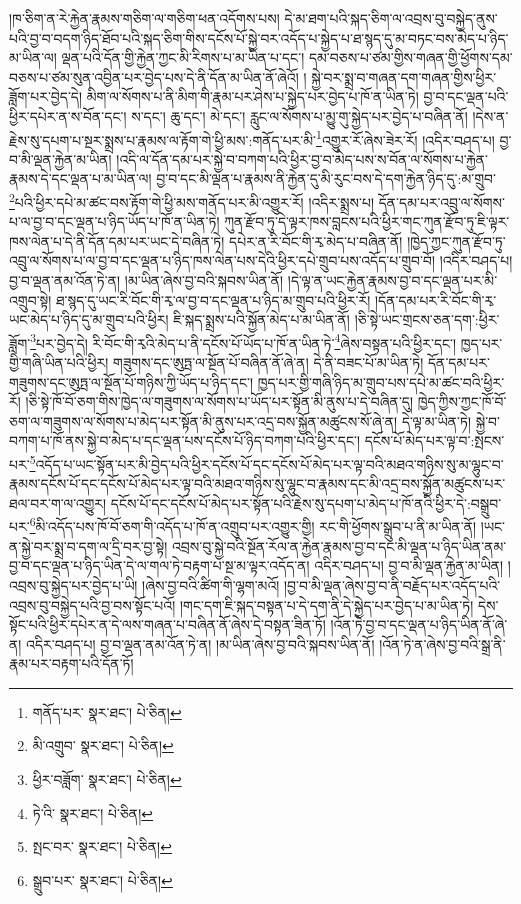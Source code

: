 །ཁ་ཅིག་ན་རེ་རྐྱེན་རྣམས་གཅིག་ལ་གཅིག་ཕན་འདོགས་པས། དེ་མ་ཐག་པའི་སྐད་ཅིག་ལ་འབྲས་བུ་བསྐྱེད་ནུས་པའི་བྱ་བ་བདག་ཉིད་ཐོབ་པའི་སྐད་ཅིག་གིས་དངོས་པོ་སྐྱེ་བར་འདོད་པ་སྐྱེད་པ་ཐ་སྙད་དུ་མ་བཏང་བས་མེད་པ་ཉིད་མ་ཡིན་ལ། ལྡན་པའི་དོན་གྱི་རྐྱེན་ཀྱང་མི་རིགས་པ་མ་ཡིན་པ་དང་། དམ་བཅས་པ་ཙམ་གྱིས་གཞན་གྱི་ཕྱོགས་དམ་བཅས་པ་ཙམ་སུན་འབྱིན་པར་བྱེད་པས་དེ་ནི་དོན་མ་ཡིན་ནོ་ཞེའོ། །
སྐྱེ་བར་སྨྲ་བ་གཞན་དག་གཞན་གྱིས་ཕྱིར་ཟློག་པར་བྱེད་དེ། མིག་ལ་སོགས་པ་ནི་མིག་གི་རྣམ་པར་ཤེས་པ་སྐྱེད་པར་བྱེད་པ་ཁོ་ན་ཡིན་ཏེ། བྱ་བ་དང་ལྡན་པའི་ཕྱིར་དཔེར་ན་ས་བོན་དང་། ས་དང་། ཆུ་དང་། མེ་དང་། རླུང་ལ་སོགས་པ་མྱུ་གུ་སྐྱེད་པར་བྱེད་པ་བཞིན་ནོ། །དེས་ན་རྗེས་སུ་དཔག་པ་སྔར་སྨྲས་པ་རྣམས་ལ་རྟོག་གེ་ཕྱི་མས་:གནོད་པར་མི་\footnote{གནོད་པར་  སྣར་ཐང་།  པེ་ཅིན། }འགྱུར་རོ་ཞེས་ཟེར་རོ། །འདིར་བཤད་པ། བྱ་བ་མི་ལྡན་རྐྱེན་མ་ཡིན། །འདི་ལ་དོན་དམ་པར་སྐྱེ་བ་བཀག་པའི་ཕྱིར་བྱ་བ་མེད་པས་ས་བོན་ལ་སོགས་པ་རྐྱེན་རྣམས་དེ་དང་ལྡན་པ་མ་ཡིན་ལ། བྱ་བ་དང་མི་ལྡན་པ་རྣམས་ནི་རྐྱེན་དུ་མི་རུང་བས་དེ་དག་རྐྱེན་ཉིད་དུ་:མ་གྲུབ་\footnote{མི་འགྲུབ་  སྣར་ཐང་།  པེ་ཅིན། }པའི་ཕྱིར་དཔེ་མ་ཚང་བས་རྟོག་གེ་ཕྱི་མས་གནོད་པར་མི་འགྱུར་རོ། །འདིར་སྨྲས་པ། དོན་དམ་པར་འབྲུ་ལ་སོགས་པ་ལ་བྱ་བ་དང་ལྡན་པ་ཉིད་ཡོད་པ་ཁོ་ན་ཡིན་ཏེ། ཀུན་རྫོབ་ཏུ་དེ་ལྟར་ཁས་བླངས་པའི་ཕྱིར་གང་ཀུན་རྫོབ་ཏུ་ཇི་ལྟར་ཁས་ལེན་པ་དེ་ནི་དོན་དམ་པར་ཡང་དེ་བཞིན་ཏེ། དཔེར་ན་རི་བོང་གི་རྭ་མེད་པ་བཞིན་ནོ། །ཁྱེད་ཀྱང་ཀུན་རྫོབ་ཏུ་འབྲུ་ལ་སོགས་པ་ལ་བྱ་བ་དང་ལྡན་པ་ཉིད་ཁས་ལེན་པས་དེའི་ཕྱིར་དཔེ་གྲུབ་པས་འདོད་པ་གྲུབ་བོ། །འདིར་བཤད་པ། བྱ་བ་ལྡན་ནམ་འོན་ཏེ་ན། །མ་ཡིན་ཞེས་བྱ་བའི་སྐབས་ཡིན་ནོ། །དེ་ལྟ་ན་ཡང་རྐྱེན་རྣམས་བྱ་བ་དང་ལྡན་པར་མི་འགྲུབ་སྟེ། ཐ་སྙད་དུ་ཡང་རི་བོང་གི་རྭ་ལ་བྱ་བ་དང་ལྡན་པ་ཉིད་མ་གྲུབ་པའི་ཕྱིར་རོ། །དོན་དམ་པར་རི་བོང་གི་རྭ་ཡང་མེད་པ་ཉིད་དུ་མ་གྲུབ་པའི་ཕྱིར། ཇི་སྐད་སྨྲས་པའི་སྐྱོན་མེད་པ་མ་ཡིན་ནོ། །ཅི་སྟེ་ཡང་གྲངས་ཅན་དག་:ཕྱིར་ཟློག་\footnote{ཕྱིར་བཟློག་  སྣར་ཐང་།  པེ་ཅིན། }པར་བྱེད་དེ། རི་བོང་གི་རྭའི་མེད་པ་ནི་དངོས་པོ་ཡོད་པ་ཁོ་ན་ཡིན་ཏེ་\footnote{ཏེ་འི་  སྣར་ཐང་།  པེ་ཅིན། }ཞེས་བསྟན་པའི་ཕྱིར་དང་། ཁྱད་པར་གྱི་གཞི་ཡིན་པའི་ཕྱིར། གཟུགས་དང་ཨུཏྤ་ལ་སྔོན་པོ་བཞིན་ནོ་ཞེ་ན། དེ་ནི་བཟང་པོ་མ་ཡིན་ཏེ། དོན་དམ་པར་གཟུགས་དང་ཨུཏྤ་ལ་སྔོན་པོ་གཉིས་ཀྱི་ཡོད་པ་ཉིད་དང་། ཁྱད་པར་གྱི་གཞི་ཉིད་མ་གྲུབ་པས་དཔེ་མ་ཚང་བའི་ཕྱིར་རོ། །ཅི་སྟེ་ཁོ་བོ་ཅག་གིས་ཁྱེད་ལ་གཟུགས་ལ་སོགས་པ་ཡོད་པར་སྟོན་མི་ནུས་པ་དེ་བཞིན་དུ། ཁྱེད་ཀྱིས་ཀྱང་ཁོ་བོ་ཅག་ལ་གཟུགས་ལ་སོགས་པ་མེད་པར་སྟོན་མི་ནུས་པར་འདྲ་བས་སྐྱོན་མཚུངས་སོ་ཞེ་ན། དེ་ལྟ་མ་ཡིན་ཏེ། སྐྱེ་བ་བཀག་པ་ཁོ་ནས་སྐྱེ་བ་མེད་པ་དང་ལྡན་པས་དངོས་པོ་ཉིད་བཀག་པའི་ཕྱིར་དང་། དངོས་པོ་མེད་པར་ལྟ་བ་:སྤངས་པར་\footnote{སྤང་བར་  སྣར་ཐང་།  པེ་ཅིན། }འདོད་པ་ཡང་སྟོན་པར་མི་བྱེད་པའི་ཕྱིར་དངོས་པོ་དང་དངོས་པོ་མེད་པར་ལྟ་བའི་མཐའ་གཉིས་སུ་མ་ལྷུང་བ་རྣམས་དངོས་པོ་དང་དངོས་པོ་མེད་པར་ལྟ་བའི་མཐའ་གཉིས་སུ་ལྷུང་བ་རྣམས་དང་མི་འདྲ་བས་སྐྱོན་མཚུངས་པར་ཐལ་བར་ག་ལ་འགྱུར། དངོས་པོ་དང་དངོས་པོ་མེད་པར་སྟོན་པའི་རྗེས་སུ་དཔག་པ་མེད་པ་ཁོ་ནའི་ཕྱིར་དེ་:བསྒྲུབ་པར་\footnote{སྒྲུབ་པར་  སྣར་ཐང་།  པེ་ཅིན། }མི་འདོད་པས་ཁོ་བོ་ཅག་གི་འདོད་པ་ཁོ་ན་འགྲུབ་པར་འགྱུར་གྱི། རང་གི་ཕྱོགས་སྒྲུབ་པ་ནི་མ་ཡིན་ནོ། །ཡང་ན་སྐྱེ་བར་སྨྲ་བ་དག་ལ་དྲི་བར་བྱ་སྟེ། འབྲས་བུ་སྐྱེ་བའི་སྔོན་རོལ་ན་རྐྱེན་རྣམས་བྱ་བ་དང་མི་ལྡན་པ་ཉིད་ཡིན་ནམ་བྱ་བ་དང་ལྡན་པ་ཉིད་ཡིན་དེ་ལ་གལ་ཏེ་བརྟག་པ་སྔ་མ་ལྟར་འདོད་ན། འདིར་བཤད་པ། བྱ་བ་མི་ལྡན་རྐྱེན་མ་ཡིན། །འབྲས་བུ་སྐྱེད་པར་བྱེད་པ་ཡི། །ཞེས་བྱ་བའི་ཚིག་གི་ལྷག་མའོ། །བྱ་བ་མི་ལྡན་ཞེས་བྱ་བ་ནི་བརྗོད་པར་འདོད་པའི་འབྲས་བུ་བསྐྱེད་པའི་བྱ་བས་སྟོང་པའོ། །གང་དག་ཇི་སྐད་བསྟན་པ་དེ་དག་ནི་དེ་སྐྱེད་པར་བྱེད་པ་མ་ཡིན་ཏེ། དེས་སྟོང་པའི་ཕྱིར་དཔེར་ན་དེ་ལས་གཞན་པ་བཞིན་ནོ་ཞེས་དེ་བསྟན་ཟིན་ཏོ། །འོན་ཏེ་བྱ་བ་དང་ལྡན་པ་ཉིད་ཡིན་ནོ་ཞེ་ན། འདིར་བཤད་པ། བྱ་བ་ལྡན་ནམ་འོན་ཏེ་ན། །མ་ཡིན་ཞེས་བྱ་བའི་སྐབས་ཡིན་ནོ། །འོན་ཏེ་ན་ཞེས་བྱ་བའི་སྒྲ་ནི་རྣམ་པར་བརྟག་པའི་དོན་ཏོ། 